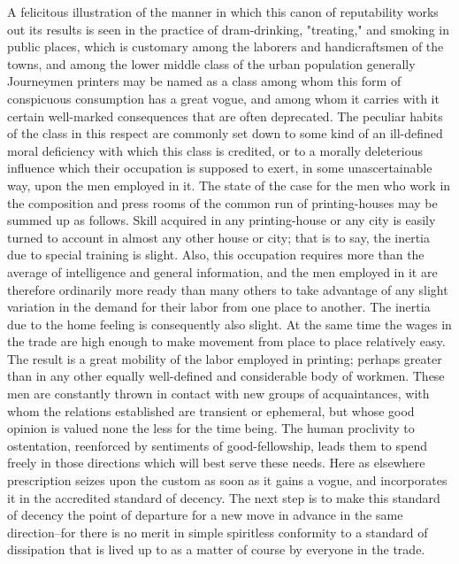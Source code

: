 \documentclass[12pt]{report}
\begin{document}
A felicitous illustration of the manner in which this canon of
reputability works out its results is seen in the practice of
dram-drinking, "treating," and smoking in public places, which is
customary among the laborers and handicraftsmen of the towns, and among
the lower middle class of the urban population generally Journeymen
printers may be named as a class among whom this form of conspicuous
consumption has a great vogue, and among whom it carries with it certain
well-marked consequences that are often deprecated. The peculiar habits
of the class in this respect are commonly set down to some kind of an
ill-defined moral deficiency with which this class is credited, or to
a morally deleterious influence which their occupation is supposed to
exert, in some unascertainable way, upon the men employed in it. The
state of the case for the men who work in the composition and press
rooms of the common run of printing-houses may be summed up as follows.
Skill acquired in any printing-house or any city is easily turned to
account in almost any other house or city; that is to say, the inertia
due to special training is slight. Also, this occupation requires more
than the average of intelligence and general information, and the men
employed in it are therefore ordinarily more ready than many others to
take advantage of any slight variation in the demand for their labor
from one place to another. The inertia due to the home feeling is
consequently also slight. At the same time the wages in the trade are
high enough to make movement from place to place relatively easy. The
result is a great mobility of the labor employed in printing; perhaps
greater than in any other equally well-defined and considerable body of
workmen. These men are constantly thrown in contact with new groups
of acquaintances, with whom the relations established are transient or
ephemeral, but whose good opinion is valued none the less for the time
being. The human proclivity to ostentation, reenforced by sentiments of
good-fellowship, leads them to spend freely in those directions which
will best serve these needs. Here as elsewhere prescription seizes
upon the custom as soon as it gains a vogue, and incorporates it in the
accredited standard of decency. The next step is to make this standard
of decency the point of departure for a new move in advance in the same
direction--for there is no merit in simple spiritless conformity to a
standard of dissipation that is lived up to as a matter of course by
everyone in the trade.
\end{document}
